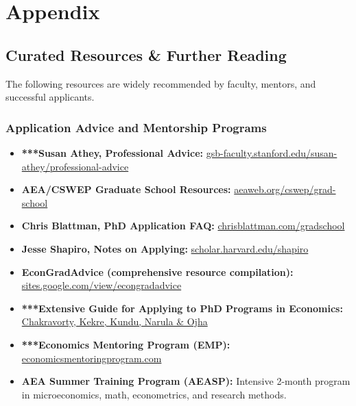 \documentclass[11pt, letterpaper]{article}
\begin{document}
\newpage

\section{Appendix}\label{sec:appendix}

\subsection{Curated Resources \& Further Reading}\label{sec:resources}

The following resources are widely recommended by faculty, mentors, and successful applicants.

\subsubsection*{Application Advice and Mentorship Programs}

\begin{itemize}[leftmargin=*, itemsep=2pt]
    \item \textbf{***Susan Athey, Professional Advice:} \href{https://gsb-faculty.stanford.edu/susan-athey/professional-advice/}{gsb-faculty.stanford.edu/susan-athey/professional-advice}
    \item \textbf{AEA/CSWEP Graduate School Resources:} \href{https://www.aeaweb.org/about-aea/committees/cswep/initiatives-and-resources/prof-dev-resources/grad-school}{aeaweb.org/cswep/grad-school}
    \item \textbf{Chris Blattman, PhD Application FAQ:} \href{https://chrisblattman.com/about/contact/gradschool/}{chrisblattman.com/gradschool}
    \item \textbf{Jesse Shapiro, Notes on Applying:} \href{https://scholar.harvard.edu/files/shapiro/files/phdnotes.pdf}{scholar.harvard.edu/shapiro}
    \item \textbf{EconGradAdvice (comprehensive resource compilation):} \href{https://sites.google.com/view/econgradadvice/}{sites.google.com/view/econgradadvice}
    \item \textbf{***Extensive Guide for Applying to PhD Programs in Economics:} \href{https://drive.google.com/file/d/1cTb8enoUZxFKscidXYwojK3bXSjb7dxr}{Chakravorty, Kekre, Kundu, Narula \& Ojha}
    \item \textbf{***Economics Mentoring Program (EMP):} \href{https://www.economicsmentoringprogram.com/}{economicsmentoringprogram.com}
    \item \textbf{AEA Summer Training Program (AEASP):} Intensive 2-month program in microeconomics, math, econometrics, and research methods.
\end{itemize}
\end{document}
